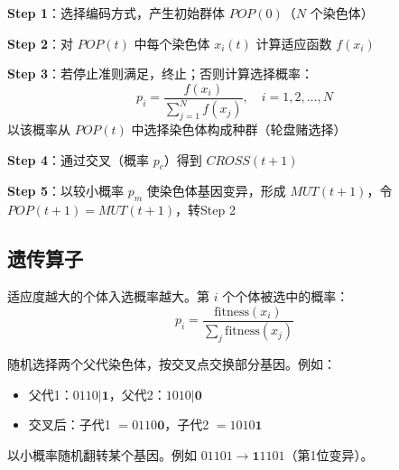 \begin{algobox}[遗传算法]
\textbf{Step 1}：选择编码方式，产生初始群体 $POP(0)$（$N$ 个染色体）

\textbf{Step 2}：对 $POP(t)$ 中每个染色体 $x_i(t)$ 计算适应函数 $f(x_i)$

\textbf{Step 3}：若停止准则满足，终止；否则计算选择概率：
\[
p_i = \frac{f(x_i)}{\sum_{j=1}^{N} f(x_j)},\quad i = 1, 2, \ldots, N
\]
以该概率从 $POP(t)$ 中选择染色体构成种群（轮盘赌选择）

\textbf{Step 4}：通过交叉（概率 $p_c$）得到 $CROSS(t+1)$

\textbf{Step 5}：以较小概率 $p_m$ 使染色体基因变异，形成 $MUT(t+1)$，令 $POP(t+1) = MUT(t+1)$，转Step 2
\end{algobox}

\subsection{遗传算子}

\begin{conceptbox}
适应度越大的个体入选概率越大。第 $i$ 个个体被选中的概率：
\[
p_i = \frac{\text{fitness}(x_i)}{\sum_j \text{fitness}(x_j)}
\]
\end{conceptbox}

\begin{conceptbox}[交叉（Crossover）]
随机选择两个父代染色体，按交叉点交换部分基因。例如：
\begin{itemize}
    \item 父代1：$0110|\textbf{1}$，父代2：$1010|\textbf{0}$
    \item 交叉后：子代1 $= 0110\textbf{0}$，子代2 $= 1010\textbf{1}$
\end{itemize}
\end{conceptbox}

\begin{conceptbox}[变异（Mutation）]
以小概率随机翻转某个基因。例如 $01101 \to \textbf{1}1101$（第1位变异）。
\end{conceptbox}

